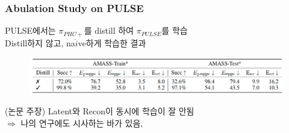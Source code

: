 \documentclass[11pt,xcolor={dvipsnames},hyperref={pdftex,pdfpagemode=UseNone,hidelinks,pdfdisplaydoctitle=true},usepdftitle=false]{beamer}
\begin{document}
\begin{frame}
\frametitle{Abulation Study on PULSE}
PULSE에서는 $\pi_{PHC+}$를 distill 하여 $\pi_{PULSE}$를 학습 \\
Distill하지 않고, na$\ddot{i}$ve하게 학습한 결과

\begin{figure}
    \centering
    \includegraphics[width=\textwidth]{figs/distill_ab.png}
\end{figure}

(논문 주장) Latent와 Recon이 동시에 학습이 잘 안됨 \\
$\Rightarrow$ 나의 연구에도 시사하는 바가 있음, \\

\end{frame}    

\begin{frame}
\frametitle{}
\end{frame}
    

\begin{frame}
\end{frame}

\lastslide
\end{document}
